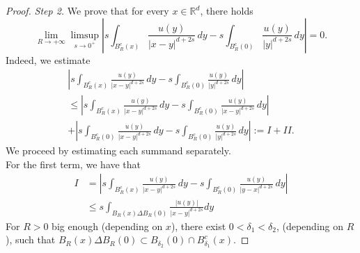 \documentclass[10pt,a4paper]{amsart}
\def\R{\mathbb{R}}
\newcommand{\abs}[1]{\left|#1\right|}
\begin{document}
\begin{proof}
    \textit{Step 2.} We prove that for every $x\in\R^d$, there holds
    \begin{equation}
    \label{claim:step2}
    \lim_{R\to+\infty}\limsup_{s\to 0^+}   \left|s\int_{B_R^c(x)}\frac{u(y)}{\abs{x-y}^{d+2s}}\,dy-s\int_{B_R^c(0)}\frac{u(y)}{\abs{y}^{d+2s}}\,dy\right|=0.
    \end{equation}
    Indeed, we estimate
     \begin{multline*}
          \left|s\int_{B_R^c(x)}\frac{u(y)}{\abs{x-y}^{d+2s}}\,dy-s\int_{B_R^c(0)}\frac{u(y)}{\abs{y}^{d+2s}}\,dy\right|\\ \leq \left|s\int_{B_R^c(x)}\frac{u(y)}{\abs{x-y}^{d+2s}}\,dy-s\int_{B_R^c(0)}\frac{u(y)}{\abs{x-y}^{d+2s}}\,dy\right|\\
            +\left|s\int_{B_R^c(0)}\frac{u(y)}{\abs{x-y}^{d+2s}}\,dy-s\int_{B_R^c(0)}\frac{u(y)}{\abs{y}^{d+2s}}\,dy\right|
            :=I+II.
    \end{multline*}
    We proceed by estimating each summand separately.\\
    For the first term, we have that
    \begin{equation*}
        \begin{split}
            I&=\left|s\int_{B_R^c(x)}\frac{u(y)}{\abs{x-y}^{d+2s}}\,dy-s\int_{B_R^c(0)}\frac{u(y)}{\abs{y-x}^{d+2s}}\,dy\right|\\
            &  \leq s\int_{B_R(x)\Delta B_R(0)}\frac{\abs{u(y)}}{\abs{x-y}^{d+2s}}dy
        \end{split}
    \end{equation*}
    For $R>0$ big enough (depending on $x$), there exist $0<\delta_1<\delta _2$, (depending on $R$), such that $B_R(x)\Delta B_R(0)\subset B_{\delta_2}(0)\cap B_{\delta_1}^c(x)$. 
    

\end{proof}
\end{document}
